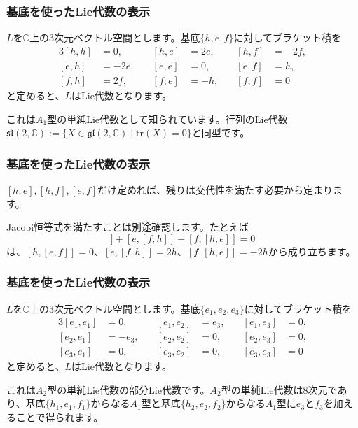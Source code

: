 \documentclass{beamer}
\begin{document}
\begin{frame}
    \frametitle{基底を使ったLie代数の表示}

    \begin{example}[$A_1$型の単純Lie代数]
        $L$を$ℂ$上の3次元ベクトル空間とします。基底$\{h,e,f\}$に対してブラケット積を
        \begin{alignat}{3}
            [h,h] & =0,   & \quad [h,e] & =2e, & \quad [h,f] & =-2f, \\
            [e,h] & =-2e, & \quad [e,e] & =0,  & \quad [e,f] & =h,   \\
            [f,h] & =2f,  & \quad [f,e] & =-h, & \quad [f,f] & =0
        \end{alignat}
        と定めると、$L$はLie代数となります。
    \end{example}

    これは$A_1$型の単純Lie代数として知られています。行列のLie代数$\mathfrak{sl}(2,ℂ):=\{X∈\mathfrak{gl}(2,ℂ)\mid\mathrm{tr}(X)=0\}$と同型です。
\end{frame}

\begin{frame}
    \frametitle{基底を使ったLie代数の表示}

    $[h,e],[h,f],[e,f]$だけ定めれば、残りは交代性を満たす必要から定まります。

    \bigskip

    Jacobi恒等式を満たすことは別途確認します。たとえば
    \begin{equation}
        [h,[e,f]]+[e,[f,h]]+[f,[h,e]]=0
    \end{equation}
    は、$[h,[e,f]]=0$、$[e,[f,h]]=2h$、$[f,[h,e]]=-2h$から成り立ちます。
\end{frame}

\begin{frame}
    \frametitle{基底を使ったLie代数の表示}

    \begin{example}[$A_2$型の単純Lie代数の部分Lie代数]
        $L$を$ℂ$上の3次元ベクトル空間とします。基底$\{e_1,e_2,e_3\}$に対してブラケット積を
        \begin{alignat}{3}
            [e_1,e_1] & =0,    & \quad [e_1,e_2] & =e_3, & \quad [e_1,e_3] & =0, \\
            [e_2,e_1] & =-e_3, & \quad [e_2,e_2] & =0,   & \quad [e_2,e_3] & =0, \\
            [e_3,e_1] & =0,    & \quad [e_3,e_2] & =0,   & \quad [e_3,e_3] & =0
        \end{alignat}
        と定めると、$L$はLie代数となります。
    \end{example}

    これは$A_2$型の単純Lie代数の部分Lie代数です。$A_2$型の単純Lie代数は8次元であり、基底$\{h_1,e_1,f_1\}$からなる$A_1$型と基底$\{h_2,e_2,f_2\}$からなる$A_1$型に$e_3$と$f_3$を加えることで得られます。
\end{frame}
\end{document}
